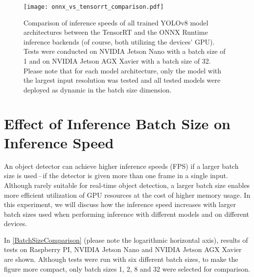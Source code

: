 
\begin{figure}[t]
    \begin{framed}
        \centering
        \texttt{[image: onnx\_vs\_tensorrt\_comparison.pdf]}
        \caption{Comparison of inference speeds of all trained YOLOv8 model
        architectures between the TensorRT and the ONNX Runtime inference backends
        (of course, both utilizing the devices' GPU). Tests were conducted on NVIDIA
        Jetson Nano with a batch size of 1 and on NVIDIA Jetson AGX Xavier with a
        batch size of 32. Please note that for each model architecture, only the
        model with the largest input resolution was tested and all tested models were
        deployed as dynamic in the batch size dimension.}
        \label{OrtVsTrtFPS}
    \end{framed}
\end{figure}









\section{Effect of Inference Batch Size on Inference Speed}
\label{BatchSizeComparisonSection}

An object detector can achieve higher inference speeds (FPS) if a larger batch
size is used\,--\,if the detector is given more than one frame in a single
input. Although rarely suitable for real-time object detection, a larger batch
size enables more efficient utilization of GPU resources at the cost of higher
memory usage. In this experiment, we will discuss how the inference speed
increases with larger batch sizes used when performing inference with different
models and on different devices.

In \autoref{BatchSizeComparison} (please note the logarithmic horizontal axis),
results of tests on Raspberry PI, NVIDIA Jetson Nano and NVIDIA Jetson AGX
Xavier are shown. Although tests were run with six different batch sizes, to
make the figure more compact, only batch sizes 1, 2, 8 and 32 were selected for
comparison.

